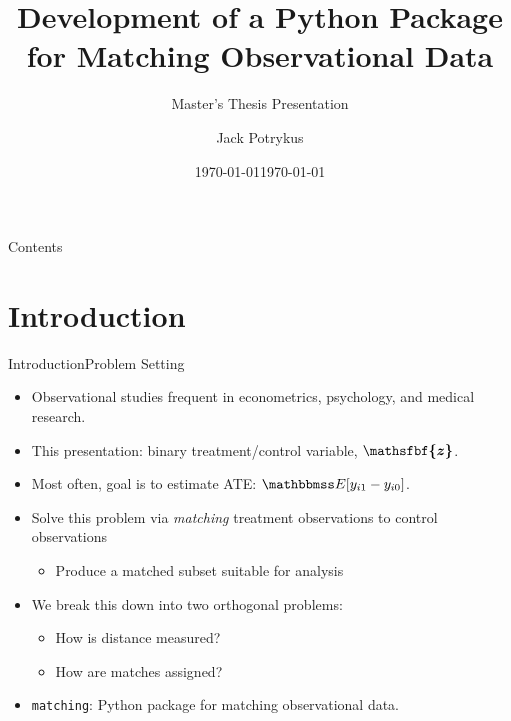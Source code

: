 \documentclass[11pt, compress]{beamer}
\title{}
\date{\today}
\title{Development of a Python Package for Matching Observational Data}
\subtitle{Master's Thesis Presentation}
\author{Jack Potrykus}
\date{\today}
\institute{University of Chicago Department of Statistics}
\renewcommand{\vec}[1]{\ensuremath{\boldsymbol{\mathsfbf{#1}}}}
\begin{document}
\maketitle

\begin{frame}{Contents}
	\tableofcontents
\end{frame}


\section{Introduction}
\begin{frame}{Introduction}{Problem Setting}
	\begin{itemize}
		\item Observational studies frequent in econometrics, psychology, and medical research.
		\item This presentation: binary treatment/control variable, $\vec{z}$.
		\item Most often, goal is to estimate ATE: $\mathbbmss E [y_{i1} - y_{i0}]$.
		\item Solve this problem via \emph{matching} treatment observations to control observations
			\begin{itemize}
				\item Produce a matched subset suitable for analysis
			\end{itemize}
		\item We break this down into two orthogonal problems:
			\begin{itemize}
				\item How is distance measured?
				\item How are matches assigned?
			\end{itemize}
		\item \texttt{matching}: Python package for matching observational data.
	\end{itemize}
\end{frame}
\end{document}
